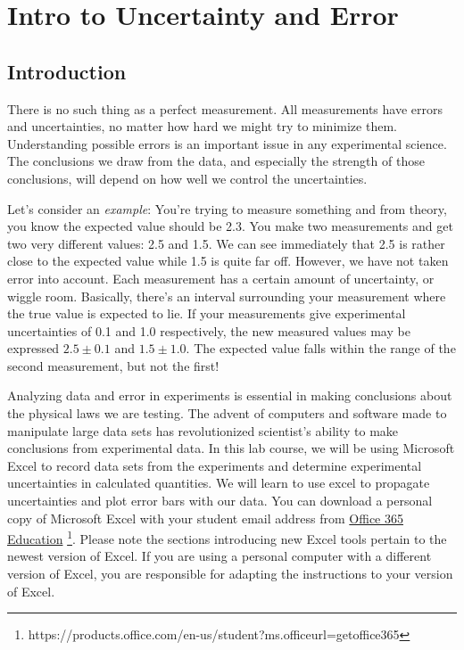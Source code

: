 \chapter{Intro to Uncertainty and Error}
\label{chap:excel}
\section{Introduction}

There is no such thing as a perfect measurement. All measurements have errors and uncertainties, no matter how hard we might try to minimize them. Understanding possible errors is an important issue in any experimental science. The conclusions we draw from the data, and especially the strength of those conclusions, will depend on how well we control the uncertainties. \myskip

Let’s consider an \emph{example}: You're trying to measure something and from theory, you know the expected value should be 2.3. You make two measurements and get two very different values: 2.5 and 1.5. We can see immediately that 2.5 is rather close to the expected value while 1.5 is quite far off. However, we have not taken error into account. Each measurement has a certain amount of uncertainty, or wiggle room. Basically, there's an interval surrounding your measurement where the true value is expected to lie. If your measurements give experimental uncertainties of 0.1 and 1.0 respectively, the new measured values may be expressed $2.5\pm 0.1$ and $1.5\pm 1.0$. The expected value falls within the range of the second measurement, but not the first! \myskip

Analyzing data and error in experiments is essential in making conclusions about the physical laws we are testing. The advent of computers and software made to manipulate large data sets has revolutionized scientist's ability to make conclusions from experimental data. In this lab course, we will be using Microsoft Excel to record data sets from the experiments and determine experimental uncertainties in calculated quantities. We will learn to use excel to propagate uncertainties and plot error bars with our data. You can download a personal copy of Microsoft Excel with your student email address from
\href{https://products.office.com/en-us/student?ms.officeurl=getoffice365}{Office 365 Education} \footnote{https://products.office.com/en-us/student?ms.officeurl=getoffice365}. Please note the sections introducing new Excel tools pertain to the newest version of Excel. If you are using a personal computer with a different version of Excel, you are responsible for adapting the instructions to your version of Excel. \myskip

